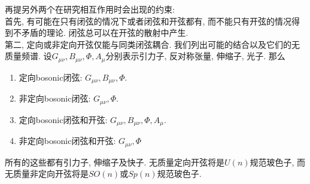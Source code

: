 再提另外两个在研究相互作用时会出现的约束: \\
首先, 有可能在只有闭弦的情况下或者闭弦和开弦都有, 而不能只有开弦的情况得到不矛盾的理论. 闭弦总可以在开弦的散射中产生. \\
第二, 定向或非定向开弦仅能与同类闭弦耦合. 我们列出可能的结合以及它们的无质量频谱. 设$G_{\mu\nu},B_{\mu\nu},\Phi,A_\mu$分别表示引力子, 反对称张量, 伸缩子, 光子. 那么
\begin{enumerate}
    \item 定向bosonic闭弦: $G_{\mu\nu},B_{\mu\nu},\Phi$.
    \item 非定向bosonic闭弦: $G_{\mu\nu},\Phi$.
    \item 定向bosonic闭弦和开弦: $G_{\mu\nu},B_{\mu\nu},\Phi,A_\mu$.
    \item 非定向bosonic闭弦和开弦: $G_{\mu\nu},\Phi$ 
\end{enumerate}
所有的这些都有引力子, 伸缩子及快子. 无质量定向开弦将是$U(n)$规范玻色子, 而无质量非定向开弦将是$SO(n)$或$Sp(n)$规范玻色子. 

